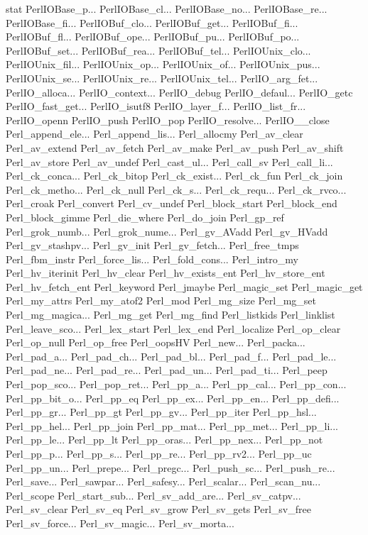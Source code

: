 stat
PerlIOBase_p...
PerlIOBase_cl...
PerlIOBase_no...
PerlIOBase_re...
PerlIOBase_fi...
PerlIOBuf_clo...
PerlIOBuf_get...
PerlIOBuf_fi...
PerlIOBuf_fl...
PerlIOBuf_ope...
PerlIOBuf_pu...
PerlIOBuf_po...
PerlIOBuf_set...
PerlIOBuf_rea...
PerlIOBuf_tel...
PerlIOUnix_clo...
PerlIOUnix_fil...
PerlIOUnix_op...
PerlIOUnix_of...
PerlIOUnix_pus...
PerlIOUnix_se...
PerlIOUnix_re...
PerlIOUnix_tel...
PerlIO_arg_fet...
PerlIO_alloca...
PerlIO_context...
PerlIO_debug
PerlIO_defaul...
PerlIO_getc
PerlIO_fast_get...
PerlIO_isutf8
PerlIO_layer_f...
PerlIO_list_fr...
PerlIO_openn
PerlIO_push
PerlIO_pop
PerlIO_resolve...
PerlIO__close
Perl_append_ele...
Perl_append_lis...
Perl_allocmy
Perl_av_clear
Perl_av_extend
Perl_av_fetch
Perl_av_make
Perl_av_push
Perl_av_shift
Perl_av_store
Perl_av_undef
Perl_cast_ul...
Perl_call_sv
Perl_call_li...
Perl_ck_conca...
Perl_ck_bitop
Perl_ck_exist...
Perl_ck_fun
Perl_ck_join
Perl_ck_metho...
Perl_ck_null
Perl_ck_s...
Perl_ck_requ...
Perl_ck_rvco...
Perl_croak
Perl_convert
Perl_cv_undef
Perl_block_start
Perl_block_end
Perl_block_gimme
Perl_die_where
Perl_do_join
Perl_gp_ref
Perl_grok_numb...
Perl_grok_nume...
Perl_gv_AVadd
Perl_gv_HVadd
Perl_gv_stashpv...
Perl_gv_init
Perl_gv_fetch...
Perl_free_tmps
Perl_fbm_instr
Perl_force_lis...
Perl_fold_cons...
Perl_intro_my
Perl_hv_iterinit
Perl_hv_clear
Perl_hv_exists_ent
Perl_hv_store_ent
Perl_hv_fetch_ent
Perl_keyword
Perl_jmaybe
Perl_magic_set
Perl_magic_get
Perl_my_attrs
Perl_my_atof2
Perl_mod
Perl_mg_size
Perl_mg_set
Perl_mg_magica...
Perl_mg_get
Perl_mg_find
Perl_listkids
Perl_linklist
Perl_leave_sco...
Perl_lex_start
Perl_lex_end
Perl_localize
Perl_op_clear
Perl_op_null
Perl_op_free
Perl_oopsHV
Perl_new...
Perl_packa...
Perl_pad_a...
Perl_pad_ch...
Perl_pad_bl...
Perl_pad_f...
Perl_pad_le...
Perl_pad_ne...
Perl_pad_re...
Perl_pad_un...
Perl_pad_ti...
Perl_peep
Perl_pop_sco...
Perl_pop_ret...
Perl_pp_a...
Perl_pp_cal...
Perl_pp_con...
Perl_pp_bit_o...
Perl_pp_eq
Perl_pp_ex...
Perl_pp_en...
Perl_pp_defi...
Perl_pp_gr...
Perl_pp_gt
Perl_pp_gv...
Perl_pp_iter
Perl_pp_hsl...
Perl_pp_hel...
Perl_pp_join
Perl_pp_mat...
Perl_pp_met...
Perl_pp_li...
Perl_pp_le...
Perl_pp_lt
Perl_pp_oras...
Perl_pp_nex...
Perl_pp_not
Perl_pp_p...
Perl_pp_s...
Perl_pp_re...
Perl_pp_rv2...
Perl_pp_uc
Perl_pp_un...
Perl_prepe...
Perl_pregc...
Perl_push_sc...
Perl_push_re...
Perl_save...
Perl_sawpar...
Perl_safesy...
Perl_scalar...
Perl_scan_nu...
Perl_scope
Perl_start_sub...
Perl_sv_add_are...
Perl_sv_catpv...
Perl_sv_clear
Perl_sv_eq
Perl_sv_grow
Perl_sv_gets
Perl_sv_free
Perl_sv_force...
Perl_sv_magic...
Perl_sv_morta...
